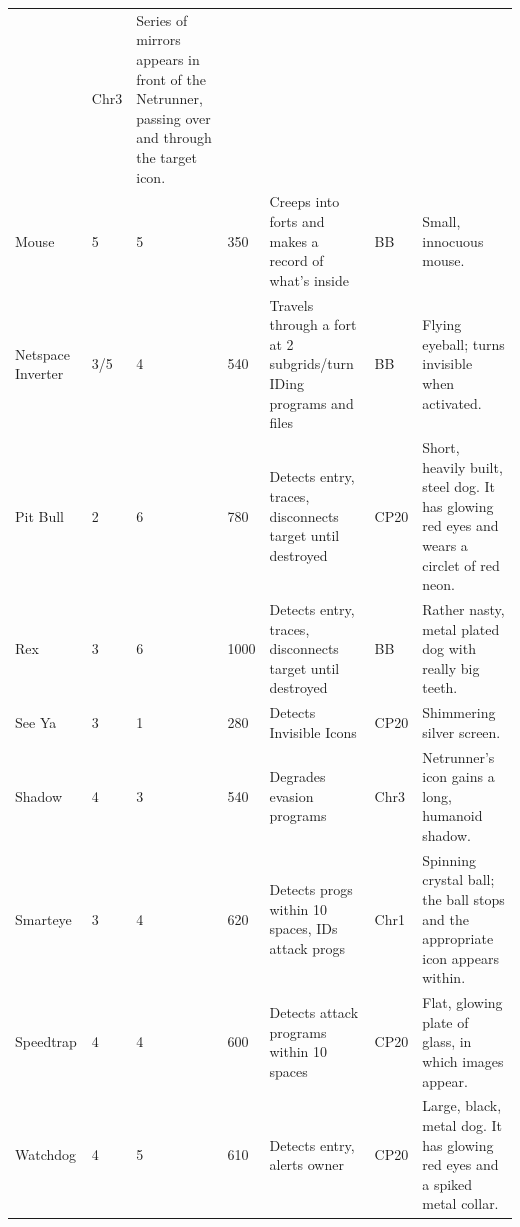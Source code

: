 \documentclass[11pt,twoside,a4paper]{article}
\begin{document}
\begin{landscape}
\begin{longtable}[ht]{ p{3.00cm} p{0.75cm} p{0.75cm} p{1.25cm} p{10.00cm} p{0.75cm} p{7.50cm} }
		&	Chr3	&		Series of mirrors appears in front of the Netrunner, passing over and through the target icon.	\\
	Mouse					&	5	&	5	&	350	&	Creeps into forts and makes a record of what's inside	
		&	BB	&		Small, innocuous mouse.	\\
	Netspace Inverter		&	3/5	&	4	&	540	&	Travels through a fort at 2 subgrids/turn IDing programs and files	
		&	BB	&		Flying eyeball; turns invisible when activated.	\\
	Pit Bull				&	2	&	6	&	780	&	Detects entry, traces, disconnects target until destroyed	
		&	CP20	&		Short, heavily built, steel dog. It has glowing red eyes and wears a circlet of red neon.	\\
	Rex						&	3	&	6	&	1000	&	Detects entry, traces, disconnects target until destroyed	
		&	BB	&		Rather nasty, metal plated dog with really big teeth.	\\
	See Ya					&	3	&	1	&	280	&	Detects Invisible Icons	
		&	CP20	&		Shimmering silver screen.	\\
	Shadow					&	4	&	3	&	540	&	Degrades evasion programs	
		&	Chr3	&		Netrunner's icon gains a long, humanoid shadow.	\\
	Smarteye				&	3	&	4	&	620	&	Detects progs within 10 spaces, IDs attack progs	
		&	Chr1	&		Spinning crystal ball; the ball stops and the appropriate icon appears within.	\\
	Speedtrap				&	4	&	4	&	600	&	Detects attack programs within 10 spaces	
		&	CP20	&		Flat, glowing plate of glass, in which images appear.	\\
	Watchdog				&	4	&	5	&	610	&	Detects entry, alerts owner	
		&	CP20	&		Large, black, metal dog. It has glowing red eyes and a spiked metal collar.	\\



\end{longtable}
\end{landscape}
\end{document}

